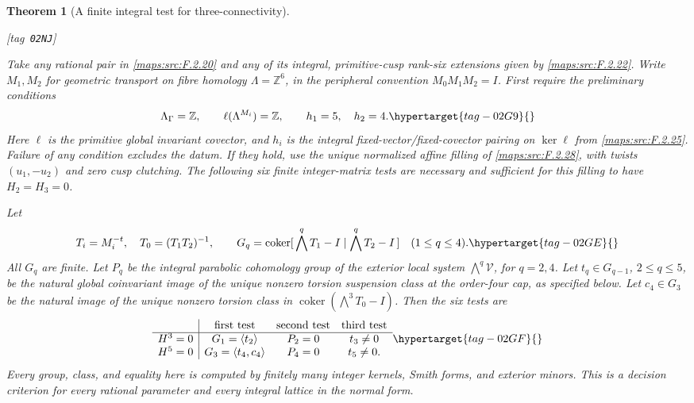 \documentclass[11pt,a4paper]{article}
\numberwithin{equation}{section}
\newtheorem{theorem}{Theorem}[section]
\theoremstyle{definition}
\newcommand{\StatementRecord}[4]{{\upshape\footnotesize[tag~\texttt{#3}]}\enspace\ignorespaces}
\begin{document}
\begin{theorem}[A finite integral test for three-connectivity]\hypertarget{tag-02NJ}{}\label{maps:src:F.2.29}
\StatementRecord{maps:src:F.2.29}{proved}{02NJ}{\cref{maps:src:F.2.20}, \cref{maps:src:F.2.22}, \cref{maps:src:F.2.25}, \cref{maps:src:F.2.28}, \cref{maps:src:F.2.6}, \eqref{maps:eq:F.HC7}, \cref{maps:src:E.1.3}, \cref{maps:src:F.2.16}}


Take any rational pair in \ref{maps:src:F.2.20} and any of its integral,
primitive-cusp rank-six extensions given by \ref{maps:src:F.2.22}.
Write $M_1,M_2$ for geometric transport on fibre homology
$\Lambda=\mathbb Z^6$, in the peripheral convention
$M_0M_1M_2=I$.
First require the preliminary conditions
\begin{equation}
 \Lambda_\Gamma=\mathbb Z,\qquad
 \ell(\Lambda^{M_i})=\mathbb Z,\qquad h_1=5,\quad h_2=4 .
 \hypertarget{tag-02G9}{}\label{maps:eq:F.HC1}
\end{equation}
Here $\ell$ is the primitive global invariant covector, and
$h_i$ is the integral fixed-vector/fixed-covector pairing
on $\ker\ell$ from \ref{maps:src:F.2.25}.
Failure of any condition excludes the datum.
If they hold, use the unique normalized affine filling of
\ref{maps:src:F.2.28}, with twists $(u_1,-u_2)$ and zero cusp clutching.
The following six finite integer-matrix tests are necessary
and sufficient for this filling to have $H_2=H_3=0$.

Let
\begin{equation}
 T_i=M_i^{-t},\quad T_0=(T_1T_2)^{-1},\qquad
 G_q=\operatorname{coker}
 [\,\bigwedge^qT_1-I\mid\bigwedge^qT_2-I\,]
 \quad(1\le q\le4).
 \hypertarget{tag-02GE}{}\label{maps:eq:F.HC2}
\end{equation}
All $G_q$ are finite.  Let $P_q$ be the integral parabolic
cohomology group of the exterior local system
$\bigwedge^q\mathcal V$, for $q=2,4$.
Let $t_q\in G_{q-1}$, $2\le q\le5$, be the natural global
coinvariant image of the unique nonzero torsion suspension
class at the order-four cap, as specified below.
Let $c_4\in G_3$ be the natural image of the unique nonzero
torsion class in
$\operatorname{coker}(\bigwedge^3T_0-I)$.
Then the six tests are
\begin{equation}
\begin{array}{c|ccc}
 &\text{first test}&\text{second test}&\text{third test}\\ \hline
 H^3=0&G_1=\langle t_2\rangle&P_2=0&t_3\ne0\\
 H^5=0&G_3=\langle t_4,c_4\rangle&P_4=0&t_5\ne0 .
\end{array}
\hypertarget{tag-02GF}{}\label{maps:eq:F.HC3}
\end{equation}
Every group, class, and equality here is computed by
finitely many integer kernels, Smith forms, and exterior
minors.  This is a decision criterion for every rational parameter and every integral lattice in the normal form.

\end{theorem}
\end{document}
